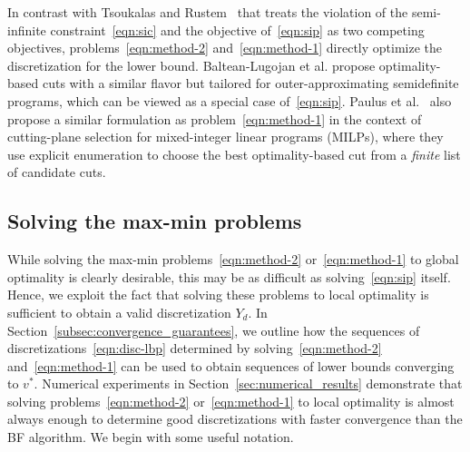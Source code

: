 \documentclass{article}
\newcommand{\1}[1]{\mathds{1}\left[#1\right]}
\begin{document}
In contrast with Tsoukalas and Rustem~\cite{tsoukalas2011feasible} that treats the violation of the semi-infinite constraint~\eqref{eqn:sic} and the objective of~\eqref{eqn:sip} as two competing objectives, problems~\eqref{eqn:method-2} and~\eqref{eqn:method-1} directly optimize the discretization for the lower bound.
Baltean-Lugojan et al. \cite{baltean2019scoring} propose optimality-based cuts with a similar flavor but tailored for outer-approximating semidefinite programs, which can be viewed as a special case of~\eqref{eqn:sip}.
Paulus et al.\ \cite{paulus2022learning} also propose a similar formulation as problem~\eqref{eqn:method-1} in the context of cutting-plane selection for mixed-integer linear programs (MILPs), where they use explicit enumeration to choose the best optimality-based cut from a \textit{finite} list of candidate cuts.




\subsection{Solving the max-min problems}
\label{subsec:solving_max_min}

While solving the max-min problems~\eqref{eqn:method-2} or~\eqref{eqn:method-1} to global optimality is clearly desirable, this may be as difficult as solving~\eqref{eqn:sip} itself. 
Hence, we exploit the fact that solving these problems to local optimality is sufficient to obtain a valid discretization $Y_d$.
In Section~\ref{subsec:convergence_guarantees}, we outline how the sequences of discretizations~\eqref{eqn:disc-lbp} determined by solving~\eqref{eqn:method-2} and~\eqref{eqn:method-1} can be used to obtain sequences of lower bounds converging to $v^*$.
Numerical experiments in Section~\ref{sec:numerical_results} demonstrate that solving problems~\eqref{eqn:method-2} or~\eqref{eqn:method-1} to local optimality is almost always enough to determine good discretizations with faster convergence than the BF algorithm.
We begin with some useful notation.
\end{document}
